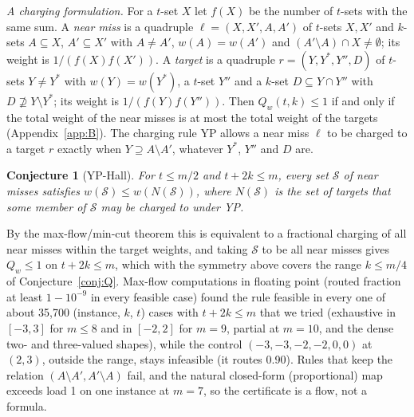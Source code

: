 \documentclass[11pt]{article}
\theoremstyle{plain}
\newtheorem{conjecture}{Conjecture}
\begin{document}
\emph{A charging formulation.} For a $t$-set $X$ let $f(X)$ be the number of $t$-sets with the same sum. A \emph{near miss} is a quadruple $\ell = (X, X', A, A')$ of $t$-sets $X, X'$ and $k$-sets $A \subseteq X$, $A' \subseteq X'$ with $A \ne A'$, $w(A) = w(A')$ and $(A' \setminus A) \cap X \ne \emptyset$; its weight is $1/(f(X)f(X'))$. A \emph{target} is a quadruple $r = (Y, Y^*, Y'', D)$ of $t$-sets $Y \ne Y^*$ with $w(Y) = w(Y^*)$, a $t$-set $Y''$ and a $k$-set $D \subseteq Y \cap Y''$ with $D \not\supseteq Y \setminus Y^*$; its weight is $1/(f(Y)f(Y''))$. Then $Q_w(t,k) \le 1$ if and only if the total weight of the near misses is at most the total weight of the targets (Appendix~\ref{app:B}). The charging rule YP allows a near miss $\ell$ to be charged to a target $r$ exactly when $Y \supseteq A \setminus A'$, whatever $Y^*$, $Y''$ and $D$ are.

\begin{conjecture}[YP-Hall]\label{conj:yp}
For $t \le m/2$ and $t + 2k \le m$, every set $\mathcal S$ of near misses satisfies $w(\mathcal S) \le w(N(\mathcal S))$, where $N(\mathcal S)$ is the set of targets that some member of $\mathcal S$ may be charged to under YP.
\end{conjecture}
By the max-flow/min-cut theorem this is equivalent to a fractional charging of all near misses within the target weights, and taking $\mathcal S$ to be all near misses gives $Q_w \le 1$ on $t + 2k \le m$, which with the symmetry above covers the range $k \le m/4$ of Conjecture~\ref{conj:Q}. Max-flow computations in floating point (routed fraction at least $1 - 10^{-9}$ in every feasible case) found the rule feasible in every one of about 35,700 (instance, $k$, $t$) cases with $t + 2k \le m$ that we tried (exhaustive in $[-3,3]$ for $m \le 8$ and in $[-2,2]$ for $m = 9$, partial at $m = 10$, and the dense two- and three-valued shapes), while the control $(-3,-3,-2,-2,0,0)$ at $(2,3)$, outside the range, stays infeasible (it routes 0.90). Rules that keep the relation $(A \setminus A', A' \setminus A)$ fail, and the natural closed-form (proportional) map exceeds load 1 on one instance at $m = 7$, so the certificate is a flow, not a formula.
\end{document}
